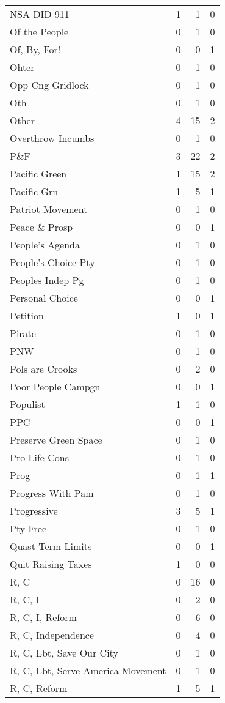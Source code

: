 \begin{supertabular}{lrrr}
NSA DID 911 & 1 & 1 & 0\\
Of the People & 0 & 1 & 0\\
Of, By, For! & 0 & 0 & 1\\
Ohter & 0 & 1 & 0\\
Opp Cng Gridlock & 0 & 1 & 0\\
Oth & 0 & 1 & 0\\
Other & 4 & 15 & 2\\
Overthrow Incumbs & 0 & 1 & 0\\
P\&F & 3 & 22 & 2\\
Pacific Green & 1 & 15 & 2\\
Pacific Grn & 1 & 5 & 1\\
Patriot Movement & 0 & 1 & 0\\
Peace \& Prosp & 0 & 0 & 1\\
People's Agenda & 0 & 1 & 0\\
People's Choice Pty & 0 & 1 & 0\\
Peoples Indep Pg & 0 & 1 & 0\\
Personal Choice & 0 & 0 & 1\\
Petition & 1 & 0 & 1\\
Pirate & 0 & 1 & 0\\
PNW & 0 & 1 & 0\\
Pols are Crooks & 0 & 2 & 0\\
Poor People Campgn & 0 & 0 & 1\\
Populist & 1 & 1 & 0\\
PPC & 0 & 0 & 1\\
Preserve Green Space & 0 & 1 & 0\\
Pro Life Cons & 0 & 1 & 0\\
Prog & 0 & 1 & 1\\
Progress With Pam & 0 & 1 & 0\\
Progressive & 3 & 5 & 1\\
Pty Free & 0 & 1 & 0\\
Quast Term Limits & 0 & 0 & 1\\
Quit Raising Taxes & 1 & 0 & 0\\
R, C & 0 & 16 & 0\\
R, C, I & 0 & 2 & 0\\
R, C, I, Reform & 0 & 6 & 0\\
R, C, Independence & 0 & 4 & 0\\
R, C, Lbt, Save Our City & 0 & 1 & 0\\
R, C, Lbt, Serve America Movement & 0 & 1 & 0\\
R, C, Reform & 1 & 5 & 1\\

\end{supertabular}
